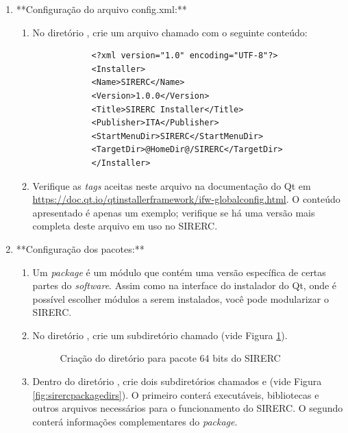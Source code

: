 \documentclass[a4paper,11pt]{article}
\newcommand{\sistema}{\textsf{SIRERC}}
\begin{document}
\begin{enumerate}
	\item **Configuração do arquivo config.xml:**
	\begin{enumerate}
		\item No diretório , crie um arquivo chamado  com o seguinte conteúdo:
		
		\begin{lstlisting}
			<?xml version="1.0" encoding="UTF-8"?>
			<Installer>
			<Name>SIRERC</Name>
			<Version>1.0.0</Version>
			<Title>SIRERC Installer</Title>
			<Publisher>ITA</Publisher>
			<StartMenuDir>SIRERC</StartMenuDir>
			<TargetDir>@HomeDir@/SIRERC</TargetDir>
			</Installer>
		\end{lstlisting}
		
		\item Verifique as \emph{tags} aceitas neste arquivo na documentação do Qt em \url{https://doc.qt.io/qtinstallerframework/ifw-globalconfig.html}. O conteúdo apresentado é apenas um exemplo; verifique se há uma versão mais completa deste arquivo em uso no \sistema{}.
	\end{enumerate}
	
	\item **Configuração dos pacotes:**
	\begin{enumerate}
		\item Um \emph{package} é um módulo que contém uma versão específica de certas partes do \emph{software}. Assim como na interface do instalador do Qt, onde é possível escolher módulos a serem instalados, você pode modularizar o \sistema{}.
		\item No diretório , crie um subdiretório chamado  (vide Figura \ref{fig:sirercinstallerpackage}).
		
		\begin{figure}[H]\centering
			\caption{Criação do diretório para pacote 64 bits do \sistema{}}\label{fig:sirercinstallerpackage}
		\end{figure}
		
		\item Dentro do diretório , crie dois subdiretórios chamados  e  (vide Figura \ref{fig:sirercpackagedirs}). O primeiro conterá executáveis, bibliotecas e outros arquivos necessários para o funcionamento do \sistema{}. O segundo conterá informações complementares do \emph{package}.
		

\end{enumerate}
\end{enumerate}
\end{document}
